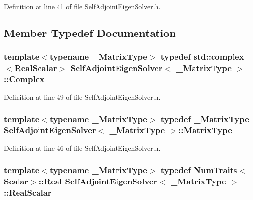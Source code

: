 Definition at line 41 of file Self\-Adjoint\-Eigen\-Solver.\-h.



\subsection{Member Typedef Documentation}
\hypertarget{class_self_adjoint_eigen_solver_a20bd3ba42d667035e1dded3d16af3a3c}{
\subsubsection[{Complex}]{\setlength{\rightskip}{0pt plus 5cm}template$<$typename \-\_\-\-Matrix\-Type$>$ typedef std\-::complex$<${\bf Real\-Scalar}$>$ {\bf Self\-Adjoint\-Eigen\-Solver}$<$ \-\_\-\-Matrix\-Type $>$\-::{\bf Complex}}}\label{class_self_adjoint_eigen_solver_a20bd3ba42d667035e1dded3d16af3a3c}


Definition at line 49 of file Self\-Adjoint\-Eigen\-Solver.\-h.

\hypertarget{class_self_adjoint_eigen_solver_aa4841a3365da9edfb78e6aff605d7da8}{
\subsubsection[{Matrix\-Type}]{\setlength{\rightskip}{0pt plus 5cm}template$<$typename \-\_\-\-Matrix\-Type$>$ typedef \-\_\-\-Matrix\-Type {\bf Self\-Adjoint\-Eigen\-Solver}$<$ \-\_\-\-Matrix\-Type $>$\-::{\bf Matrix\-Type}}}\label{class_self_adjoint_eigen_solver_aa4841a3365da9edfb78e6aff605d7da8}


Definition at line 46 of file Self\-Adjoint\-Eigen\-Solver.\-h.

\hypertarget{class_self_adjoint_eigen_solver_a4f5e61b89882e72b13843e9817226f6a}{
\subsubsection[{Real\-Scalar}]{\setlength{\rightskip}{0pt plus 5cm}template$<$typename \-\_\-\-Matrix\-Type$>$ typedef {\bf Num\-Traits}$<${\bf Scalar}$>$\-::Real {\bf Self\-Adjoint\-Eigen\-Solver}$<$ \-\_\-\-Matrix\-Type $>$\-::{\bf Real\-Scalar}}}\label{class_self_adjoint_eigen_solver_a4f5e61b89882e72b13843e9817226f6a}


